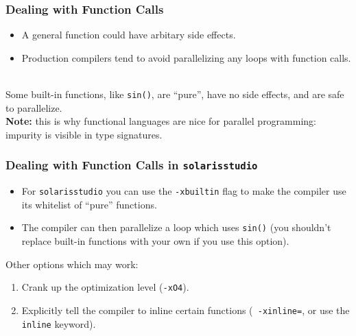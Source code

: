 \begin{frame}
  \frametitle{Dealing with Function Calls}

  
  \begin{itemize}
    \item A general function could have arbitary side effects.
    \item Production compilers tend to avoid parallelizing any loops with
      function calls.
  \end{itemize}
~\\[1em]

  Some built-in functions, like {\tt sin()}, are ``pure'', have no side
  effects, and are safe to parallelize.
~\\[1em]
  {\bf Note:} this is why functional languages are nice for parallel
  programming: impurity is visible in type signatures.

\end{frame}

\begin{frame}
  \frametitle{Dealing with Function Calls in {\tt solarisstudio}}

  
  \begin{itemize}
    \item For {\tt solarisstudio} you can use the {\tt -xbuiltin} flag to make
      the compiler use its whitelist of ``pure'' functions.
    \item The compiler can then parallelize a loop which uses {\tt sin()}
      (you shouldn't replace built-in functions with your own if you use this
      option).
  \end{itemize}
  \vfill
  Other options which may work:
  
  \begin{enumerate}
    \item Crank up the optimization level ({\tt -xO4}).
    \item Explicitly tell the compiler to inline certain functions ({\tt
      -xinline=}, or use the {\tt inline} keyword).
  \end{enumerate}

\end{frame}


